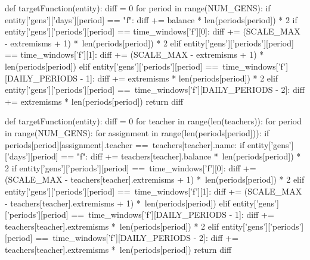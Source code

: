 \documentclass[12pt,a4paper]{report}
\begin{document}
\begin{python}
def targetFunction(entity):
    diff = 0
    for period in range(NUM_GENS):
        if entity['gens']['days'][period] == "f":
            diff += balance * len(periods[period]) * 2
        if entity['gens']['periods'][period] == time_windows['f'][0]:
            diff += (SCALE_MAX - extremisms + 1) *\
                len(periods[period]) * 2
        elif entity['gens']['periods'][period] == time_windows['f'][1]:
            diff += (SCALE_MAX - extremisms + 1) * len(periods[period])
        elif entity['gens']['periods'][period] ==\
           time_windows['f'][DAILY_PERIODS - 1]:
            diff += extremisms * len(periods[period]) * 2
        elif entity['gens']['periods'][period] ==\
           time_windows['f'][DAILY_PERIODS - 2]:
            diff += extremisms * len(periods[period])
    return diff


def targetFunction(entity):
    diff = 0
    for teacher in range(len(teachers)):
        for period in range(NUM_GENS):
            for assignment in range(len(periods[period])):
                if periods[period][assignment].teacher ==\
                   teachers[teacher].name:
                    if entity['gens']['days'][period] == "f":
                        diff += teachers[teacher].balance *\
                            len(periods[period]) * 2
                    if entity['gens']['periods'][period] ==\
                       time_windows['f'][0]:
                        diff += (SCALE_MAX -
                            teachers[teacher].extremisms + 1) *\
                            len(periods[period]) * 2
                    elif entity['gens']['periods'][period] ==\
                       time_windows['f'][1]:
                        diff += (SCALE_MAX -
                            teachers[teacher].extremisms + 1) *\
                            len(periods[period])
                    elif entity['gens']['periods'][period] ==\
                       time_windows['f'][DAILY_PERIODS - 1]:
                        diff += teachers[teacher].extremisms *\
                            len(periods[period]) * 2
                    elif entity['gens']['periods'][period] ==\
                       time_windows['f'][DAILY_PERIODS - 2]:
                        diff += teachers[teacher].extremisms *\
                            len(periods[period])
    return diff



\end{python}
\end{document}

